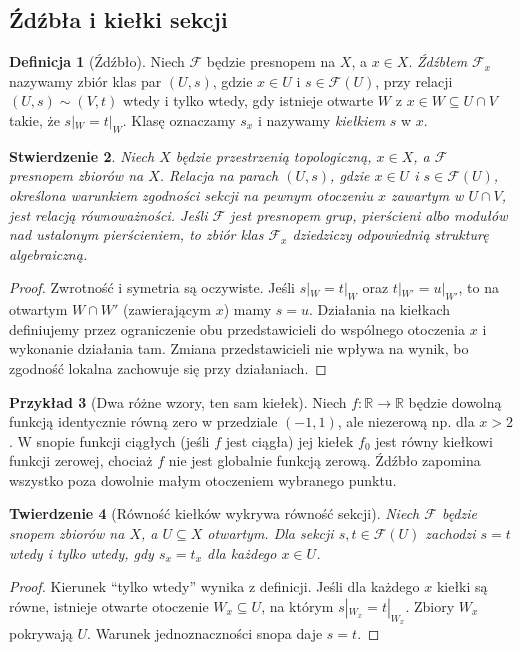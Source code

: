 \documentclass[11pt,a4paper,openany]{report}
\numberwithin{equation}{section}
\theoremstyle{plain}
\newtheorem{twierdzenie}{Twierdzenie}[section]
\newtheorem{stwierdzenie}[twierdzenie]{Stwierdzenie}
\theoremstyle{definition}
\newtheorem{definicja}[twierdzenie]{Definicja}
\newtheorem{przyklad}[twierdzenie]{Przykład}
\theoremstyle{remark}
\newcommand{\R}{\mathbb R}
\begin{document}
\subsection{Źdźbła i kiełki sekcji}
\begin{definicja}[Źdźbło]
\label{def:stalk}
Niech $\mathcal F$ będzie presnopem na $X$,
a $x\in X$. \emph{Źdźbłem} $\mathcal F_x$
nazywamy zbiór klas par $(U,s)$, gdzie $x\in U$
i $s\in\mathcal F(U)$, przy relacji
$(U,s)\sim(V,t)$ wtedy i tylko wtedy, gdy istnieje
otwarte $W$ z $x\in W\subseteq U\cap V$
takie, że $s|_W=t|_W$. Klasę oznaczamy $s_x$
i nazywamy \emph{kiełkiem} $s$ w $x$.
\end{definicja}

\begin{stwierdzenie}
Niech $X$ będzie przestrzenią topologiczną, $x\in X$,
a $\mathcal F$ presnopem zbiorów na $X$. Relacja na
parach $(U,s)$, gdzie $x\in U$ i $s\in\mathcal F(U)$,
określona warunkiem zgodności sekcji na pewnym otoczeniu
$x$ zawartym w $U\cap V$, jest relacją równoważności.
Jeśli $\mathcal F$ jest presnopem grup, pierścieni albo
modułów nad ustalonym pierścieniem, to zbiór klas
$\mathcal F_x$ dziedziczy odpowiednią strukturę algebraiczną.
\end{stwierdzenie}
\begin{proof}
Zwrotność i symetria są oczywiste. Jeśli
$s|_W=t|_W$ oraz $t|_{W'}=u|_{W'}$, to
na otwartym $W\cap W'$ (zawierającym $x$)
mamy $s=u$. Działania na kiełkach definiujemy
przez ograniczenie obu przedstawicieli do
wspólnego otoczenia $x$ i wykonanie działania tam.
Zmiana przedstawicieli nie wpływa na wynik,
bo zgodność lokalna zachowuje się przy działaniach.
\end{proof}

\begin{przyklad}[Dwa różne wzory, ten sam kiełek]
Niech $f:\R\to\R$ będzie dowolną funkcją
identycznie równą zero w przedziale $(-1,1)$,
ale niezerową np. dla $x>2$. W snopie funkcji
ciągłych (jeśli $f$ jest ciągła) jej kiełek
$f_0$ jest równy kiełkowi funkcji zerowej,
chociaż $f$ nie jest globalnie funkcją zerową.
Źdźbło zapomina wszystko poza dowolnie małym
otoczeniem wybranego punktu.
\end{przyklad}

\begin{twierdzenie}[Równość kiełków wykrywa równość sekcji]
\label{tw:germ-zero}
Niech $\mathcal F$ będzie snopem zbiorów na $X$,
a $U\subseteq X$ otwartym. Dla sekcji
$s,t\in\mathcal F(U)$ zachodzi $s=t$ wtedy
i tylko wtedy, gdy $s_x=t_x$ dla każdego $x\in U$.
\end{twierdzenie}
\begin{proof}
Kierunek ``tylko wtedy'' wynika z definicji.
Jeśli dla każdego $x$ kiełki są równe,
istnieje otwarte otoczenie $W_x\subseteq U$, na
którym $s|_{W_x}=t|_{W_x}$. Zbiory $W_x$ pokrywają $U$.
Warunek jednoznaczności snopa daje $s=t$.
\end{proof}
\end{document}
